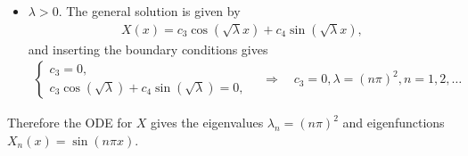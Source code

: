 \documentclass[12pt, a4paper]{article}
\begin{document}
\begin{spacing}{1.1}
\begin{itemize}
	\item \underline{$\lambda > 0$}. The general solution is given by
	\begin{align*}
	X(x) = c_3\cos(\sqrt{\lambda }x) + c_4\sin(\sqrt{\lambda}x),
	\end{align*}
	and inserting the boundary conditions gives
	\begin{align*}
	\left\{
	\begin{array}{l}
	c_3 = 0, \\
	c_3\cos(\sqrt{\lambda }) + c_4 \sin(\sqrt{\lambda}) = 0,
	\end{array}
	\right. \quad\Rightarrow\quad c_3 = 0, \lambda = (n\pi)^2, n = 1, 2, \ldots
	\end{align*}
\end{itemize}
Therefore the ODE for $X$ gives the eigenvalues $\lambda_n = (n\pi)^2$ and eigenfunctions $X_n(x) = \sin(n\pi x)$.


\end{spacing}
\end{document}
